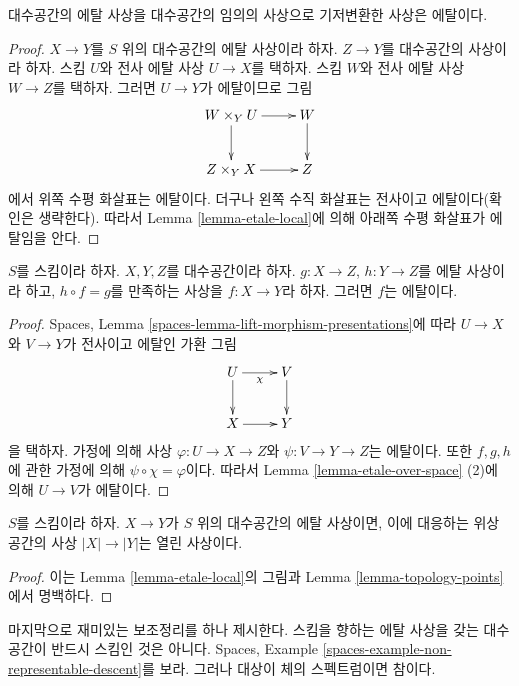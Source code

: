\begin{lemma}
\label{lemma-base-change-etale}
대수공간의 에탈 사상을 대수공간의 임의의 사상으로 기저변환한 사상은
에탈이다.
\end{lemma}

\begin{proof}
$X \to Y$를 $S$ 위의 대수공간의 에탈 사상이라 하자.
$Z \to Y$를 대수공간의 사상이라 하자.
스킴 $U$와 전사 에탈 사상 $U \to X$를 택하자.
스킴 $W$와 전사 에탈 사상 $W \to Z$를 택하자.
그러면 $U \to Y$가 에탈이므로 그림
$$
\xymatrix{
W \times_Y U \ar[d] \ar[r] & W \ar[d] \\
Z \times_Y X \ar[r] & Z
}
$$
에서 위쪽 수평 화살표는 에탈이다.
더구나 왼쪽 수직 화살표는 전사이고 에탈이다(확인은 생략한다).
따라서 Lemma \ref{lemma-etale-local}에 의해 아래쪽 수평 화살표가
에탈임을 안다.
\end{proof}

\begin{lemma}
\label{lemma-etale-permanence}
$S$를 스킴이라 하자. $X, Y, Z$를 대수공간이라 하자.
$g : X \to Z$, $h : Y \to Z$를 에탈 사상이라 하고,
$h \circ f = g$를 만족하는 사상을 $f : X \to Y$라 하자.
그러면 $f$는 에탈이다.
\end{lemma}

\begin{proof}
Spaces, Lemma \ref{spaces-lemma-lift-morphism-presentations}에 따라
$U \to X$와 $V \to Y$가 전사이고 에탈인 가환 그림
$$
\xymatrix{
U \ar[d] \ar[r]_\chi & V \ar[d] \\
X \ar[r] & Y
}
$$
을 택하자. 가정에 의해 사상 $\varphi : U \to X \to Z$와
$\psi : V \to Y \to Z$는 에탈이다. 또한 $f, g, h$에 관한 가정에 의해
$\psi \circ \chi = \varphi$이다.
따라서 Lemma \ref{lemma-etale-over-space} (2)에 의해
$U \to V$가 에탈이다.
\end{proof}

\begin{lemma}
\label{lemma-etale-open}
$S$를 스킴이라 하자.
$X \to Y$가 $S$ 위의 대수공간의 에탈 사상이면, 이에 대응하는
위상공간의 사상 $|X| \to |Y|$는 열린 사상이다.
\end{lemma}

\begin{proof}
이는 Lemma \ref{lemma-etale-local}의 그림과
Lemma \ref{lemma-topology-points}에서 명백하다.
\end{proof}

\noindent
마지막으로 재미있는 보조정리를 하나 제시한다. 스킴을 향하는 에탈
사상을 갖는 대수공간이 반드시 스킴인 것은 아니다. Spaces, Example
\ref{spaces-example-non-representable-descent}를 보라.
그러나 대상이 체의 스펙트럼이면 참이다.

